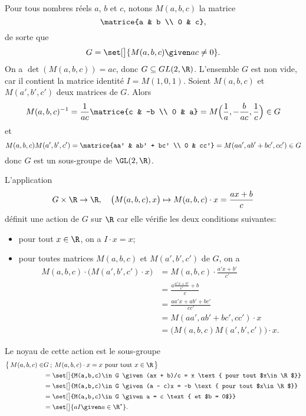 Pour tous nombres réels $a$, $b$ et $c$, notons $M(a,b,c)$ la matrice
\[
  \matrice{a & b \\ 0 & c},
\]
de sorte que
\[
  G = \set[\big]{M(a,b,c) \given ac\neq 0}.
\]
On a $\det(M(a,b,c)) = ac$, donc $G\subseteq GL(2,\R)$.
L'ensemble $G$ est non vide, car il contient la matrice identité $I = M(1,0,1)$.
Soient $M(a,b,c)$ et $M(a',b',c')$ deux matrices de $G$.
Alors
\[
  M(a,b,c)^{-1}
    = \frac{1}{ac}\matrice{c & -b \\ 0 & a}
    = M\Bigl( \frac{1}{a}, -\frac{b}{ac}, \frac{1}{c} \Bigr)
    \in G
\]
et
\[
  M(a,b,c) M(a',b',c')
    = \matrice{aa' & ab' + bc' \\ 0 & cc'}
    = M(aa', ab'+bc', cc')
    \in G
\]
donc $G$ est un sous-groupe de $\GL(2,\R)$.

L'application
%
\begin{align*}
     G\times\R \to \R, \quad \bigl(M(a,b,c),x\bigr) \mapsto M(a,b,c) \cdot x =  \frac{ax+b}{c}
\end{align*}
%
définit une action de $G$ sur $\R$ car elle vérifie les deux conditions suivantes:
%
\begin{itemize}
  \item pour tout $x\in\R$, on a $I\cdot x = x$;
  \item pour toutes matrices $M(a,b,c)$ et $M(a',b',c')$ de $G$, on a
    \begin{align*}
      M(a,b,c) \cdot \bigl( M(a',b',c') \cdot x \bigr)
        &= M(a,b,c) \cdot \frac{a'x + b'}{c'} \\
        &= \frac{a\frac{a'x + b'}{c'}  + b}{c} \\
        &= \frac{aa'x + ab' + bc'}{cc'} \\
        &= M(aa', ab'+bc', cc') \cdot x \\
        &= \bigl( M(a,b,c)M(a',b',c') \bigr) \cdot x.
    \end{align*}
\end{itemize}

Le noyau de cette action est le sous-groupe
%
\[
  \begin{split}
    \bigl\{\, M(a,b,c)\in &G\:;\:M(a,b,c) \cdot x = x \text{ pour tout $x\in\R$} \,\bigr\} \\
    &= \set[\big]{M(a,b,c)\in G \given (ax + b)/c = x \text{ pour tout $x\in\R$}} \\
    &= \set[\big]{M(a,b,c)\in G \given (a - c)x = -b \text{ pour tout $x\in\R$}} \\
    &= \set[\big]{M(a,b,c)\in G \given a = c \text{ et $b = 0$}} \\
    &= \set[\big]{aI \given a\in\R^*}.
  \end{split}
\]

